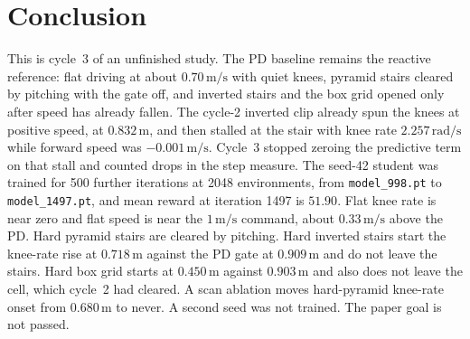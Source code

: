 \documentclass[11pt]{article}
\begin{document}
\section{Conclusion}
\label{sec:conclusion}

This is cycle~3 of an unfinished study.
The PD baseline remains the reactive reference: flat driving at about \(0.70\,\mathrm{m/s}\) with quiet knees, pyramid stairs cleared by pitching with the gate off, and inverted stairs and the box grid opened only after speed has already fallen.
The cycle-2 inverted clip already spun the knees at positive speed, at \(0.832\,\mathrm{m}\), and then stalled at the stair with knee rate \(2.257\,\mathrm{rad/s}\) while forward speed was \(-0.001\,\mathrm{m/s}\).
Cycle~3 stopped zeroing the predictive term on that stall and counted drops in the step measure.
The seed-42 student was trained for 500 further iterations at 2048 environments, from \texttt{model\_998.pt} to \texttt{model\_1497.pt}, and mean reward at iteration 1497 is \(51.90\).
Flat knee rate is near zero and flat speed is near the \(1\,\mathrm{m/s}\) command, about \(0.33\,\mathrm{m/s}\) above the PD.
Hard pyramid stairs are cleared by pitching.
Hard inverted stairs start the knee-rate rise at \(0.718\,\mathrm{m}\) against the PD gate at \(0.909\,\mathrm{m}\) and do not leave the stairs.
Hard box grid starts at \(0.450\,\mathrm{m}\) against \(0.903\,\mathrm{m}\) and also does not leave the cell, which cycle~2 had cleared.
A scan ablation moves hard-pyramid knee-rate onset from \(0.680\,\mathrm{m}\) to never.
A second seed was not trained.
The paper goal is not passed.

\printbibliography
\end{document}
